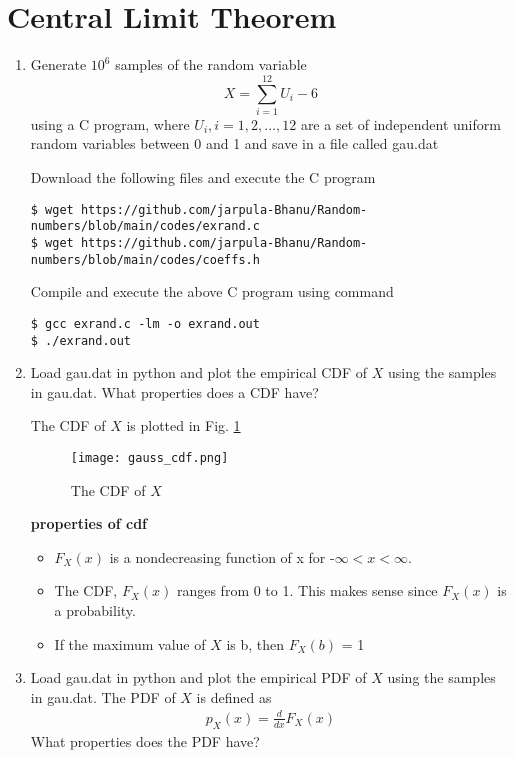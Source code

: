 \documentclass[journal,12pt,twocolumn]{IEEEtran}
\renewcommand\thesection{\arabic{section}}
\begin{document}
\section{Central Limit Theorem}
%
\begin{enumerate}[label=\thesection.\arabic*
,ref=\thesection.\theenumi]

%
\item
Generate $10^6$ samples of the random variable
%
\begin{equation}
X = \sum_{i=1}^{12}U_i -6
\end{equation}
%
using a C program, where $U_i, i = 1,2,\dots, 12$ are  a set of independent uniform random variables between 0 and 1
and save in a file called gau.dat

\solution
Download the following files and execute the C program
\begin{lstlisting}
$ wget https://github.com/jarpula-Bhanu/Random-numbers/blob/main/codes/exrand.c
$ wget https://github.com/jarpula-Bhanu/Random-numbers/blob/main/codes/coeffs.h
\end{lstlisting}
Compile and execute the above C program using command
\begin{lstlisting}
$ gcc exrand.c -lm -o exrand.out
$ ./exrand.out
\end{lstlisting}
%
\item
Load gau.dat in python and plot the empirical CDF of $X$ using the samples in gau.dat. What properties does a CDF have?

\solution The CDF of $X$ is plotted in Fig. \ref{fig:gauss_cdf}
\begin{figure}[h]
    \centering
    \texttt{[image: gauss\_cdf.png]}
    \caption{The CDF of $X$}
    \label{fig:gauss_cdf}
\end{figure}
\textbf{properties of cdf}
\begin{itemize}
    \item $F_X(x)$ is a nondecreasing function of x for -$\infty < x < \infty$. 
    \item The CDF, $F_X(x)$ ranges from 0 to 1. This makes sense since $F_X(x)$ is a probability.
    \item If the maximum value of $X$ is b, then $F_X(b)$ = 1 \\
\end{itemize} 

\item
Load gau.dat in python and plot the empirical PDF of $X$ using the samples in gau.dat. The PDF of $X$ is defined as
\begin{align}
p_{X}(x) = \frac{d}{dx}F_{X}(x)
\end{align}
What properties does the PDF have?


\end{enumerate}
\end{document}
